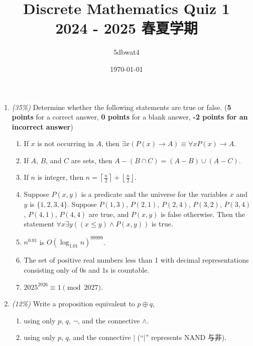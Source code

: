 \documentclass{article}
\title{Discrete Mathematics Quiz 1\\\small{2024 - 2025 春夏学期}}
\author{5dbwat4}
\date{\today}
\begin{document}
\maketitle


\begin{enumerate}
\def\labelenumi{\arabic{enumi}.}
\item
  \emph{(35\%)} Determine whether the following statements are true or
  false. (\textbf{5 points} for a correct answer, \textbf{0 points} for
  a blank answer, \textbf{-2 points for an incorrect answer})

\begin{enumerate}
\def\labelenumi{\alph{enumi})}
\item
  If \(x\) is not occurring in \(A\), then
  \(\exists x(P(x)\to A)\equiv \forall x P(x) \to A\).
\item
  If \(A\), \(B\), and \(C\) are sets, then
  \(A-(B\cap C)=(A - B)\cup(A - C)\).
\item
  If \(n\) is integer, then
  \(n=\left\lceil\frac{n}{2}\right\rceil+\left\lfloor\frac{n}{2}\right\rfloor\).
\item
  Suppose \(P(x,y)\) is a predicate and the universe for the variables
  \(x\) and \(y\) is \(\{1,2,3,4\}\). Suppose \(P(1,3)\), \(P(2,1)\), \(P(2,4)\),
  \(P(3,2)\), \(P(3,4)\), \(P(4,1)\), \(P(4,4)\) are true, and
  \(P(x,y)\) is false otherwise. Then the statement
  \(\forall x\exists y((x\leq y)\land P(x,y))\) is true.
\item
  \(n^{0.01}\) is \(O(\log_{1.01}{n})^{99999}\).
\item
  The set of positive real numbers less than 1 with decimal
  representations consisting only of 0s and 1s is countable.
\item
  \(2025^{2026}\equiv1\pmod{2027}\).
\end{enumerate}

\item
  \emph{(12\%)} Write a proposition equivalent to \(p\oplus q\),

\begin{enumerate}
\def\labelenumi{\alph{enumi})}
\item
  using only \(p\), \(q\), \(\neg\), and the connective \(\land\).
\item
  using only \(p\), \(q\), and the connective \(|\) (``\(|\)''
  represents NAND 与非).
\end{enumerate}


\end{enumerate}
\end{document}

